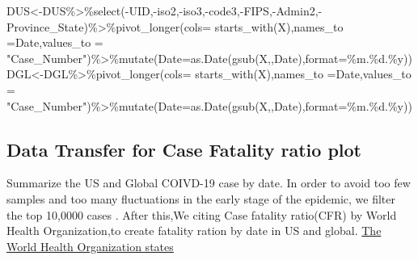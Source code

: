 \documentclass[
]{article}
\newenvironment{Shaded}{\begin{snugshade}}{\end{snugshade}}
\newcommand{\AttributeTok}[1]{\textcolor[rgb]{0.77,0.63,0.00}{#1}}
\newcommand{\FunctionTok}[1]{\textcolor[rgb]{0.00,0.00,0.00}{#1}}
\newcommand{\NormalTok}[1]{#1}
\newcommand{\OtherTok}[1]{\textcolor[rgb]{0.56,0.35,0.01}{#1}}
\newcommand{\SpecialCharTok}[1]{\textcolor[rgb]{0.00,0.00,0.00}{#1}}
\newcommand{\StringTok}[1]{\textcolor[rgb]{0.31,0.60,0.02}{#1}}
\begin{document}
\begin{Shaded}
\begin{Highlighting}[]
\NormalTok{DUS}\OtherTok{\textless{}{-}}\NormalTok{DUS}\SpecialCharTok{\%\textgreater{}\%}\FunctionTok{select}\NormalTok{(}\SpecialCharTok{{-}}\NormalTok{UID,}\SpecialCharTok{{-}}\NormalTok{iso2,}\SpecialCharTok{{-}}\NormalTok{iso3,}\SpecialCharTok{{-}}\NormalTok{code3,}\SpecialCharTok{{-}}\NormalTok{FIPS,}\SpecialCharTok{{-}}\NormalTok{Admin2,}\SpecialCharTok{{-}}\NormalTok{Province\_State)}\SpecialCharTok{\%\textgreater{}\%}\FunctionTok{pivot\_longer}\NormalTok{(}\AttributeTok{cols=} \FunctionTok{starts\_with}\NormalTok{(}\StringTok{\textquotesingle{}X\textquotesingle{}}\NormalTok{),}\AttributeTok{names\_to =}\StringTok{\textquotesingle{}Date\textquotesingle{}}\NormalTok{,}\AttributeTok{values\_to =} \StringTok{"Case\_Number"}\NormalTok{)}\SpecialCharTok{\%\textgreater{}\%}\FunctionTok{mutate}\NormalTok{(}\AttributeTok{Date=}\FunctionTok{as.Date}\NormalTok{(}\FunctionTok{gsub}\NormalTok{(}\StringTok{\textquotesingle{}X\textquotesingle{}}\NormalTok{,}\StringTok{\textquotesingle{}\textquotesingle{}}\NormalTok{,Date),}\AttributeTok{format=}\StringTok{\textquotesingle{}\%m.\%d.\%y\textquotesingle{}}\NormalTok{))}
\NormalTok{DGL}\OtherTok{\textless{}{-}}\NormalTok{DGL}\SpecialCharTok{\%\textgreater{}\%}\FunctionTok{pivot\_longer}\NormalTok{(}\AttributeTok{cols=} \FunctionTok{starts\_with}\NormalTok{(}\StringTok{\textquotesingle{}X\textquotesingle{}}\NormalTok{),}\AttributeTok{names\_to =}\StringTok{\textquotesingle{}Date\textquotesingle{}}\NormalTok{,}\AttributeTok{values\_to =} \StringTok{"Case\_Number"}\NormalTok{)}\SpecialCharTok{\%\textgreater{}\%}\FunctionTok{mutate}\NormalTok{(}\AttributeTok{Date=}\FunctionTok{as.Date}\NormalTok{(}\FunctionTok{gsub}\NormalTok{(}\StringTok{\textquotesingle{}X\textquotesingle{}}\NormalTok{,}\StringTok{\textquotesingle{}\textquotesingle{}}\NormalTok{,Date),}\AttributeTok{format=}\StringTok{\textquotesingle{}\%m.\%d.\%y\textquotesingle{}}\NormalTok{))}
\end{Highlighting}
\end{Shaded}

\hypertarget{data-transfer-for-case-fatality-ratio-plot}{%
\subsection{Data Transfer for Case Fatality ratio
plot}\label{data-transfer-for-case-fatality-ratio-plot}}

Summarize the US and Global COIVD-19 case by date. In order to avoid too
few samples and too many fluctuations in the early stage of the
epidemic, we filter the top 10,0000 cases . After this,We citing Case
fatality ratio(CFR) by World Health Organization,to create fatality
ration by date in US and global.
\href{https://www.who.int/news-room/commentaries/detail/estimating-mortality-from-covid-19}{The
World Health Organization states}
\end{document}
